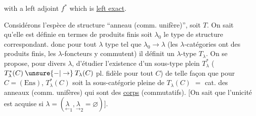 with a left adjoint $f^*$ which is \uline{left exact}.

Considérons l'espèce de structure ``anneau (comm. unifère)'', soit $T$.
On sait qu'elle est définie en termes de produits finis
soit $\lambda_0$  le type de structure correspondant. 
donc pour tout $\lambda$ type tel que $\lambda_0\longrightarrow\lambda$ (les
$\lambda$-catégories ont des produits finis, les $\lambda$-foncteurs y commutent)
il définit un $\lambda$-type $T_\lambda$. On se propose, pour divers
$\lambda$, d'étudier l'existence  d'un sous-type plein $T_\lambda^*$
($T_\lambda^*(C)\mathbin{\unsure{-|\to}}T_\lambda(C)$ pl. fidèle pour tout $C$) de telle façon que
pour $C=(\mathrm{Ens})$, $T_\lambda^*(C)$ soit la sous-catégorie  pleine de
$T_\lambda(C)$  $=$ cat. des anneaux (comm. unifères) qui sont des \uline{corps} \unsure{$\xi$}
(commutatifs). [On sait que l'unicité est acquise si $\lambda=(\underset{\leftarrow}{\lambda}_1,\underset{\longrightarrow}{\lambda}_2=\varnothing)$].


